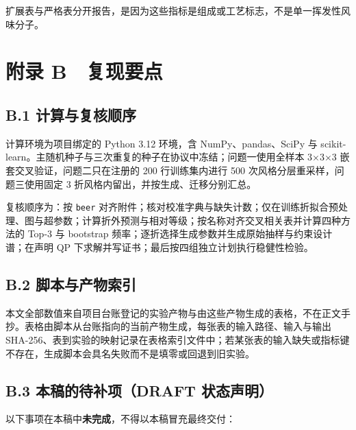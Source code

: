 \documentclass[11pt,a4paper]{article}
\begin{document}
扩展表与严格表分开报告，是因为这些指标是组成或工艺标志，不是单一挥发性风味分子。

\section*{附录
B　复现要点}\label{ux9644ux5f55-b-ux590dux73b0ux8981ux70b9}

\subsection*{B.1
计算与复核顺序}\label{b.1-ux8ba1ux7b97ux4e0eux590dux6838ux987aux5e8f}

计算环境为项目绑定的 Python 3.12 环境，含 NumPy、pandas、SciPy 与
scikit-learn。主随机种子与三次重复的种子在协议中冻结；问题一使用全样本
3×3×3 嵌套交叉验证，问题二只在注册的 200 行训练集内进行 500
次风格分层重采样，问题三使用固定 3
折风格内留出，并按生成、迁移分别汇总。

复核顺序为：按 \texttt{beer}
对齐附件；核对校准字典与缺失计数；仅在训练折拟合预处理、图与超参数；计算折外预测与相对等级；按名称对齐交叉相关表并计算四种方法的
Top-3 与 bootstrap
频率；逐折选择生成参数并生成原始抽样与约束设计谱；在声明 QP
下求解并写证书；最后按四组独立计划执行稳健性检验。

\subsection*{B.2
脚本与产物索引}\label{b.2-ux811aux672cux4e0eux4ea7ux7269ux7d22ux5f15}

本文全部数值来自项目台账登记的实验产物与由这些产物生成的表格，不在正文手抄。表格由脚本从台账指向的当前产物生成，每张表的输入路径、输入与输出
SHA-256、表到实验的映射记录在表格索引文件中；若某张表的输入缺失或指标键不存在，生成脚本会具名失败而不是填零或回退到旧实验。

\subsection*{B.3 本稿的待补项（DRAFT
状态声明）}\label{b.3-ux672cux7a3fux7684ux5f85ux8865ux9879draft-ux72b6ux6001ux58f0ux660e}

以下事项在本稿中\textbf{未完成}，不得以本稿冒充最终交付：
\end{document}
